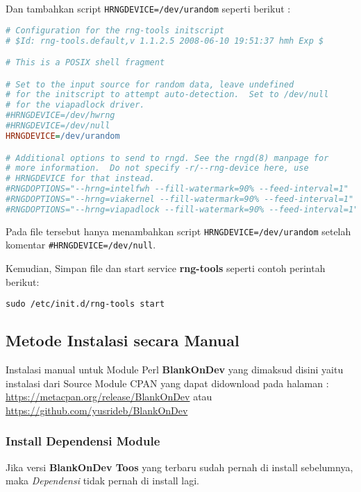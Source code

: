 \noindent
Dan tambahkan script \texttt{HRNGDEVICE=/dev/urandom} seperti berikut :

\begin{lstlisting}[language=Ini]
# Configuration for the rng-tools initscript
# $Id: rng-tools.default,v 1.1.2.5 2008-06-10 19:51:37 hmh Exp $

# This is a POSIX shell fragment

# Set to the input source for random data, leave undefined
# for the initscript to attempt auto-detection.  Set to /dev/null
# for the viapadlock driver.
#HRNGDEVICE=/dev/hwrng
#HRNGDEVICE=/dev/null
HRNGDEVICE=/dev/urandom

# Additional options to send to rngd. See the rngd(8) manpage for
# more information.  Do not specify -r/--rng-device here, use
# HRNGDEVICE for that instead.
#RNGDOPTIONS="--hrng=intelfwh --fill-watermark=90% --feed-interval=1"
#RNGDOPTIONS="--hrng=viakernel --fill-watermark=90% --feed-interval=1"
#RNGDOPTIONS="--hrng=viapadlock --fill-watermark=90% --feed-interval=1"
\end{lstlisting}

\noindent
Pada file tersebut hanya menambahkan script \texttt{HRNGDEVICE=/dev/urandom} setelah 
komentar \texttt{\#HRNGDEVICE=/dev/null}.

\noindent
Kemudian, Simpan file dan start service \textbf{rng-tools} seperti contoh perintah berikut:

\begin{lstlisting}[language=ShellBash]
sudo /etc/init.d/rng-tools start
\end{lstlisting}

\subsection{Metode Instalasi secara Manual}
\noindent
Instalasi manual untuk Module Perl \textbf{BlankOnDev} yang dimaksud disini yaitu instalasi dari Source Module CPAN yang dapat didownload pada halaman : \\ \footnotesize{\url{https://metacpan.org/release/BlankOnDev}} atau \\
\footnotesize{\url{https://github.com/yusrideb/BlankOnDev}}

\subsubsection{Install Dependensi Module}
\noindent
Jika versi \textbf{BlankOnDev Toos} yang terbaru sudah pernah di install sebelumnya, maka \textit{Dependensi} tidak pernah di install lagi.

